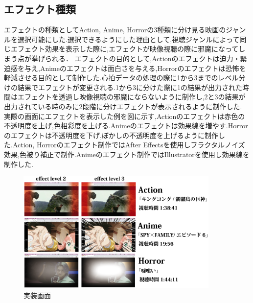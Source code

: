 \subsection{エフェクト種類}
エフェクトの種類としてAction, Anime, Horrorの3種類に分け見る映画のジャンルを選択可能にした.選択できるようにした理由として,視聴ジャンルによって同じエフェクト効果を表示した際に,エフェクトが映像視聴の際に邪魔になってしまう点が挙げられる．
エフェクトの目的として,Actionのエフェクトは迫力・緊迫感を与え,Animeのエフェクトは面白さを与える,Horrorのエフェクトは恐怖を軽減させる目的として制作した.心拍データの処理の際に1から3までのレベル分けの結果でエフェクトが変更される.1から3に分けた際に1の結果が出力された時間はエフェクトを透過し映像視聴の邪魔にならないように制作し,2と3の結果が出力されている時のみに2段階に分けエフェクトが表示されるように制作した.
実際の画面にエフェクトを表示した例を図に示す,Actionのエフェクトは赤色の不透明度を上げ,色相彩度を上げる.Animeのエフェクトは効果線を増やす.Horrorのエフェクトは不透明度を下げ,ぼかしの不透明度を上げるように制作した.Action, Horrorのエフェクト制作ではAfter Effectsを使用しフラクタルノイズ効果,色被り補正で制作.Animeのエフェクト制作ではIllustratorを使用し効果線を制作した.

\begin{figure}[H]
    \centering
    \includegraphics[width=10cm]{images/chapter3/effectjissou.jpg}
    \caption{実装画面}
\end{figure}